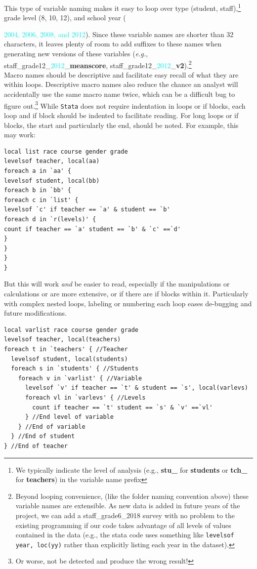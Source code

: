 This type of  variable naming makes it easy to loop over type ({\textcolor{uscred}{student}}, {\textcolor{uscgold}{staff}}),\footnote{We typically indicate the level of analysis (e.g., \textcolor{uscred}{\textbf{stu\_}} for \textcolor{uscred}{\textbf{students}} or \textcolor{uscgold}{\textbf{tch\_}} for \textcolor{uscgold}{\textbf{teachers}}) in the variable name prefix} grade level (8, 10, 12), and school year ({\textcolor{cyan}{2004, 2006, 2008, and 2012}).  Since these variable names are shorter than 32 characters, it leaves plenty of room to add suffixes to these names when generating new versions of these variables (\textit{e.g.}, {\textcolor{uscgold}{\textsf{staff}}}\_grade12\_{\textcolor{cyan}{2012}}\_\textbf{meanscore},  {\textcolor{uscgold}{\textsf{staff}}}\_grade12\_{\textcolor{cyan}{2012}}\_\textbf{v2}).\footnote{Beyond looping convenience, (like the folder naming convention above) these variable names are extensible. As new data is added in future years of the project, we can add a staff\_grade6\_2018 survey with no problem to the existing programming if our code takes advantage of all levels of values contained in the data (e.g., the stata code uses something like \texttt{levelsof year, loc(yy)} rather than explicitly listing each year in the dataset).} \\


Macro names should be descriptive and facilitate easy recall of what they are within loops. Descriptive macro names also reduce the chance an analyst will accidentally use the same macro name twice, which can be a difficult bug to figure out.\footnote{Or worse, not be detected and produce the wrong result!} While \texttt{Stata} does not require indentation in loops or if blocks, each loop and if block should be indented to facilitate reading. For long loops or if blocks, the start and particularly the end, should be noted. For example, this may work:
\begin{lstlisting}
local list race course gender grade
levelsof teacher, local(aa)
foreach a in `aa' {
levelsof student, local(bb)
foreach b in `bb' {
foreach c in `list' {
levelsof `c' if teacher == `a' & student == `b'
foreach d in `r(levels)' {
count if teacher == `a' student == `b' & `c' ==`d'
}
}
}
}
\end{lstlisting}
But this will work \emph{and} be easier to read, especially if the manipulations or calculations or are more extensive, or if there are if blocks within it. Particularly with complex nested loops, labeling or numbering each loop eases de-bugging and future modifications.
\begin{lstlisting}
local varlist race course gender grade
levelsof teacher, local(teachers)
foreach t in `teachers' { //Teacher
  levelsof student, local(students)
  foreach s in `students' { //Students
    foreach v in `varlist' { //Variable
      levelsof `v' if teacher == `t' & student == `s', local(varlevs)
      foreach vl in `varlevs' { //Levels
        count if teacher == `t' student == `s' & `v' ==`vl'
      } //End level of variable
    } //End of variable
  } //End of student
} //End of teacher
\end{lstlisting}

}
